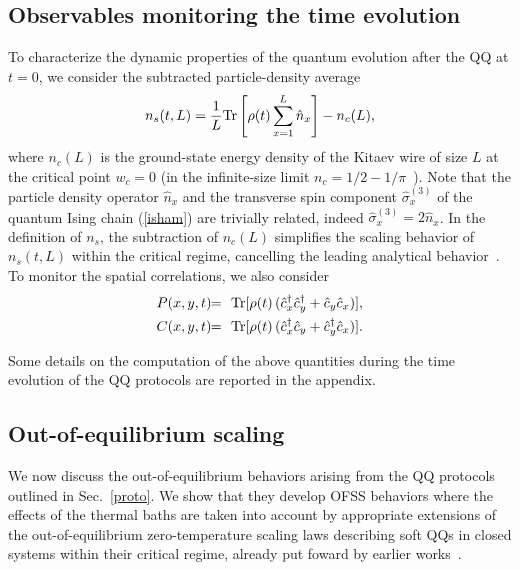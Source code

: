 \subsection{Observables monitoring the time evolution}
\label{obs}


To characterize the dynamic properties of the quantum evolution after
the QQ at $t=0$, we consider the subtracted particle-density average
\begin{eqnarray}
n_s(t,L) = {1\over L} {\rm Tr} \left[ \rho(t) \sum_{x=1}^L \hat{n}_x \right]
- n_c(L),
 \label{ddef}
\end{eqnarray}
 where $n_c(L)$ is the ground-state energy density of the Kitaev wire
 of size $L$ at the critical point $w_c=0$ (in the infinite-size limit
 $n_c= 1/2 - 1/\pi$~\cite{PF70}). Note that the particle density
 operator $\hat{n}_x$ and the transverse spin component
 $\hat\sigma_x^{(3)}$ of the quantum Ising chain (\ref{isham}) are
 trivially related, indeed $\hat{\sigma}_x^{(3)} = 2 \hat{n}_x$.  In
 the definition of $n_s$, the subtraction of $n_c(L)$ simplifies the
 scaling behavior of $n_s(t,L)$ within the critical regime, cancelling
 the leading analytical behavior~\cite{CV2014,rossini2021coherent}. To monitor the
 spatial correlations, we also consider
\begin{eqnarray}
P(x,y,t) & \!\! = \!\! & {\rm Tr}[\rho(t)\,(\hat c_x^\dagger 
\hat c_{y}^\dagger +
    \hat c_{y} \hat c_{x})],\label{ptf}\\ 
C(x,y,t) & \!\! = \!\! & {\rm Tr}[\rho(t)\, (\hat c_x^\dagger \hat c_{y} 
+ \hat
    c_{y}^\dagger \hat c_{x})].\label{gtf} 
\end{eqnarray}

Some details on the computation of the above quantities during the
time evolution of the QQ protocols are reported in the appendix.


\subsection{Out-of-equilibrium scaling}
\label{scabeh}

We now discuss the out-of-equilibrium behaviors arising from the QQ
protocols outlined in Sec.~\ref{proto}.  We show that they develop
OFSS behaviors where the effects of the thermal baths are taken into
account by appropriate extensions of the out-of-equilibrium
zero-temperature scaling laws describing soft QQs in
closed systems within their critical regime, already put foward by
earlier works~\cite{pelissetto2017dynamic,rossini2021coherent}.

